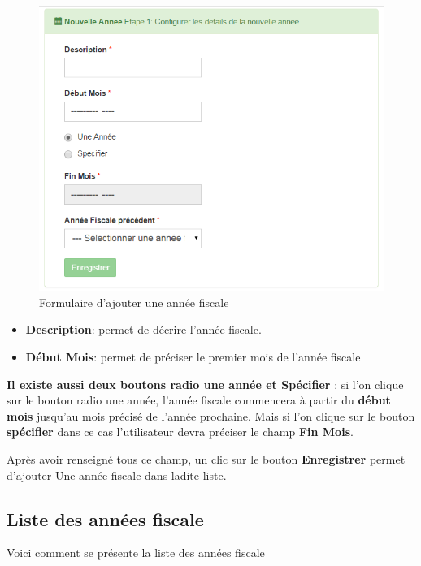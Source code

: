 \documentclass[12pt,a4paper]{report}
\begin{document}
\begin{figure}[h]
\begin{center}
\includegraphics[width=12cm]{pic/FormCreationAnnFisc.png}
\end{center}
\caption{Formulaire d'ajouter une année fiscale}
\label{Formulaire d'ajouter une année fiscale}
\end{figure}
\begin{itemize}
\item \textbf{Description}: permet de décrire l'année fiscale.
\item \textbf{Début Mois}: permet de préciser le premier mois de l'année fiscale
\end{itemize}
\textbf{Il existe aussi deux boutons radio une année et Spécifier }: si l'on clique sur le bouton radio une année, l'année fiscale commencera à partir du \textbf{début mois} jusqu'au mois précisé de l'année prochaine. Mais si l'on clique sur le bouton \textbf{spécifier} dans ce cas l'utilisateur devra préciser le champ \textbf{Fin Mois}.

Après avoir renseigné tous ce champ, un clic sur le bouton \textbf{Enregistrer} permet d'ajouter Une année fiscale dans ladite liste.
\subsection{Liste des années fiscale}
Voici comment se présente la liste des années fiscale
\end{document}
